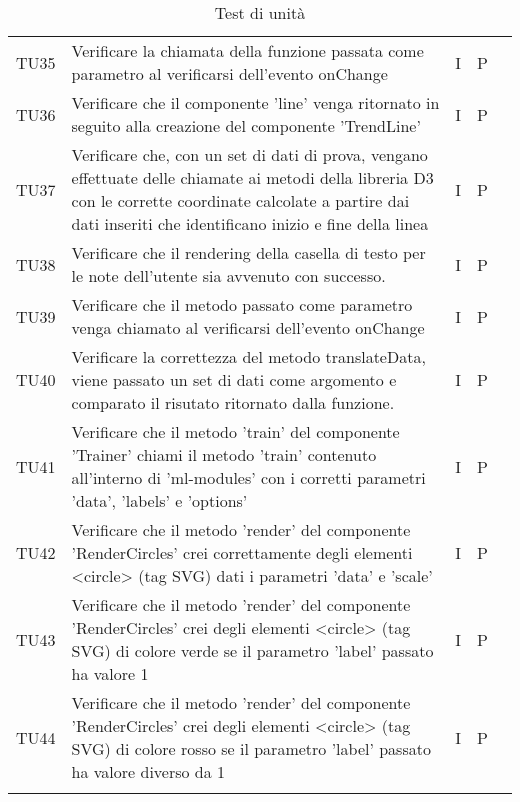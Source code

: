 \begin{longtable} {
		>{}p{15mm} 
		>{}p{79.5mm}
		>{}p{15mm} 
		>{}p{15mm}
		>{}p{0mm}}
	TU35	& Verificare la chiamata della funzione passata come parametro al verificarsi dell'evento onChange & I & P &\TBstrut \\ [2mm]
	TU36	& Verificare che il componente 'line' venga ritornato in seguito alla creazione del componente 'TrendLine' & I & P &\TBstrut \\ [2mm]
	TU37	& Verificare che, con un set di dati di prova, vengano effettuate delle chiamate ai metodi della libreria D3 con le corrette coordinate calcolate a partire dai dati inseriti che identificano inizio e fine della linea & I & P &\TBstrut \\ [2mm]
	TU38	& Verificare che il rendering della casella di testo per le note dell'utente sia avvenuto con successo. & I & P &\TBstrut \\ [2mm]
	TU39	& Verificare che il metodo passato come parametro venga chiamato al verificarsi dell'evento onChange & I & P &\TBstrut \\ [2mm]
	TU40	& Verificare la correttezza del metodo translateData, viene passato un set di dati come argomento e comparato il risutato ritornato dalla funzione. & I & P &\TBstrut \\ [2mm]
	TU41	& Verificare che il metodo 'train' del componente 'Trainer' chiami il metodo 'train' contenuto all'interno di 'ml-modules' con i corretti parametri 'data', 'labels' e 'options' & I & P &\TBstrut \\ [2mm]
	TU42	& Verificare che il metodo 'render' del componente 'RenderCircles' crei correttamente degli elementi <circle> (tag SVG) dati i parametri 'data' e 'scale' & I & P &\TBstrut \\ [2mm]
	TU43	& Verificare che il metodo 'render' del componente 'RenderCircles' crei degli elementi <circle> (tag SVG) di colore verde se il parametro 'label' passato ha valore 1 & I & P &\TBstrut \\ [2mm]
	TU44	& Verificare che il metodo 'render' del componente 'RenderCircles' crei degli elementi <circle> (tag SVG) di colore rosso se il parametro 'label' passato ha valore diverso da 1 & I & P &\TBstrut \\ [2mm]
	\rowcolor{white}
	\caption{Test di unità}
\end{longtable}
